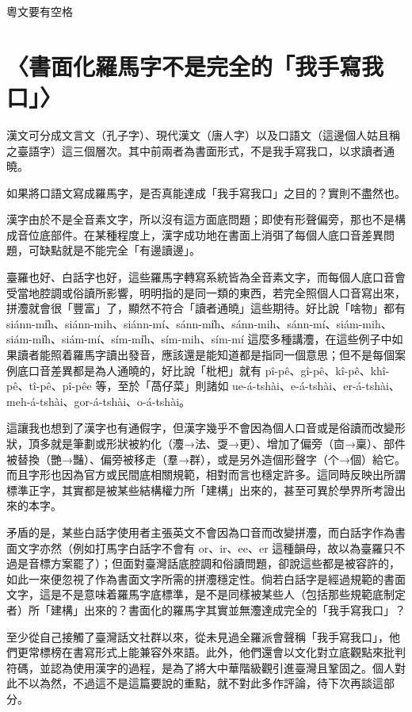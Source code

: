 \documentclass[a5paper, 10pt, openany]{book} %
\begin{document}
粵文要有空格


\chapter{〈書面化羅馬字不是完全的「我手寫我口」〉}

漢文可分成文言文（孔子字）、現代漢文（唐人字）以及口語文（這邊個人姑且稱之臺語字）這三個層次。其中前兩者為書面形式，不是我手寫我口，以求讀者通曉。

如果將口語文寫成羅馬字，是否真能達成「我手寫我口」之目的？實則不盡然也。

漢字由於不是全音素文字，所以沒有這方面底問題；即使有形聲偏旁，那也不是構成音位底部件。在某種程度上，漢字成功地在書面上消弭了每個人底口音差異問題，可缺點就是不能完全「有邊讀邊」。

臺羅也好、白話字也好，這些羅馬字轉寫系統皆為全音素文字，而每個人底口音會受當地腔調或俗讀所影響，明明指的是同一類的東西，若完全照個人口音寫出來，拼灋就會很「豐富」了，顯然不符合「讀者通曉」這些期待。好比說「啥物」都有 siánn-mi̍h、siánn-mih、siánn-mí、sánn-mi̍h、sánn-mih、sánn-mí、siám-mih、siám-mi̍h、siám-mí、sím-mi̍h、sím-mih、sím-mí 這麼多種講灋，在這些例子中如果讀者能照着羅馬字讀出發音，應該還是能知道都是指同一個意思；但不是每個案例底口音差異都是為人通曉的，好比說「枇杷」就有 pî-pê、gî-pê、kî-pê、khî-pê、tî-pê、pî-pêe 等，至於「萵仔菜」則諸如 ue-á-tshài、e-á-tshài、er-á-tshài、meh-á-tshài、gor-á-tshài、o-á-tshài。

這讓我也想到了漢字也有通假字，但漢字幾乎不會因為個人口音或是俗讀而改變形狀，頂多就是筆劃或形狀被約化（灋→法、㪅→更）、增加了偏旁（㐭→稟）、部件被替換（艷→豔）、偏旁被移走（羣→群），或是另外造個形聲字（个→個）給它。而且字形也因為官方或民間底相關規範，相對而言也穩定許多。這同時反映出所謂標準正字，其實都是被某些結構權力所「建構」出來的，甚至可異於學界所考證出來的本字。

矛盾的是，某些白話字使用者主張英文不會因為口音而改變拼灋，而白話字作為書面文字亦然（例如打馬字白話字不會有 or、ir、ee、er 這種韻母，故以為臺羅只不過是音標方案罷了）；但面對臺灣話底腔調和俗讀問題，卻說這些都是被容許的，如此一來便忽視了作為書面文字所需的拼灋穩定性。倘若白話字是經過規範的書面文字，這是不是意味着羅馬字底標準，是不是同樣被某些人（包括那些規範底制定者）所「建構」出來的？書面化的羅馬字其實並無灋達成完全的「我手寫我口」？

至少從自己接觸了臺灣話文社群以來，從未見過全羅派會聲稱「我手寫我口」，他們更常標榜在書寫形式上能兼容外來語。此外，他們還會以文化對立底觀點來批判符碼，並認為使用漢字的過程，是為了將大中華階級觀引進臺灣且鞏固之。個人對此不以為然，不過這不是這篇要說的重點，就不對此多作評論，待下次再談這部分。
\end{document}
